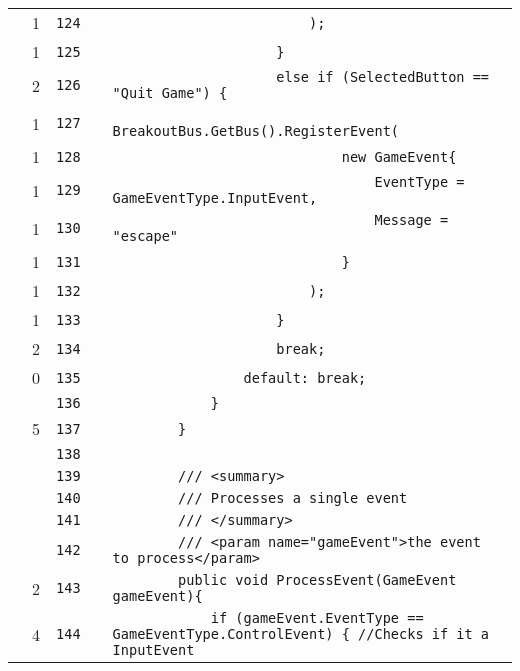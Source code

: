 \documentclass[a4paper,landscape,10pt]{article}
\begin{document}
\begin{longtable}[l]{lrrll}
\cellcolor{green} & 1 & \verb~124~ & & \verb~                        );~\\
\cellcolor{green} & 1 & \verb~125~ & & \verb~                    }~\\
\cellcolor{green} & 2 & \verb~126~ & & \verb~                    else if (SelectedButton == "Quit Game") {~\\
\cellcolor{green} & 1 & \verb~127~ & & \verb~                        BreakoutBus.GetBus().RegisterEvent(~\\
\cellcolor{green} & 1 & \verb~128~ & & \verb~                            new GameEvent{~\\
\cellcolor{green} & 1 & \verb~129~ & & \verb~                                EventType = GameEventType.InputEvent,~\\
\cellcolor{green} & 1 & \verb~130~ & & \verb~                                Message = "escape"~\\
\cellcolor{green} & 1 & \verb~131~ & & \verb~                            }~\\
\cellcolor{green} & 1 & \verb~132~ & & \verb~                        );~\\
\cellcolor{green} & 1 & \verb~133~ & & \verb~                    }~\\
\cellcolor{green} & 2 & \verb~134~ & & \verb~                    break;~\\
\cellcolor{red} & 0 & \verb~135~ & & \verb~                default: break;~\\
\cellcolor{gray} &  & \verb~136~ & & \verb~            }~\\
\cellcolor{green} & 5 & \verb~137~ & & \verb~        }~\\
\cellcolor{gray} &  & \verb~138~ & & \verb~~\\
\cellcolor{gray} &  & \verb~139~ & & \verb~        /// <summary>~\\
\cellcolor{gray} &  & \verb~140~ & & \verb~        /// Processes a single event~\\
\cellcolor{gray} &  & \verb~141~ & & \verb~        /// </summary>~\\
\cellcolor{gray} &  & \verb~142~ & & \verb~        /// <param name="gameEvent">the event to process</param>~\\
\cellcolor{green} & 2 & \verb~143~ & & \verb~        public void ProcessEvent(GameEvent gameEvent){~\\
\cellcolor{green} & 4 & \verb~144~ & & \verb~            if (gameEvent.EventType == GameEventType.ControlEvent) { //Checks if it a InputEvent~\\

\end{longtable}
\end{document}
